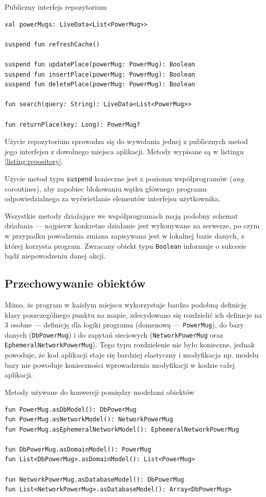 \documentclass[polish,polish,a4paper,12pt]{article}
\begin{document}
	\begin{listing}[H]
		\caption{Publiczny interfejs repozytorium}
		\begin{verbatim}
val powerMugs: LiveData<List<PowerMug>>

suspend fun refreshCache()

suspend fun updatePlace(powerMug: PowerMug): Boolean
suspend fun insertPlace(powerMug: PowerMug): Boolean
suspend fun deletePlace(powerMug: PowerMug): Boolean

fun search(query: String): LiveData<List<PowerMug>>

fun returnPlace(key: Long): PowerMug?
		\end{verbatim}
		\label{listing:repository}
	\end{listing}

	Użycie repozytorium sprowadza się do wywołania jednej z publicznych metod jego interfejsu z dowolnego miejsca aplikacji. Metody wypisane są w listingu \ref{listing:repository}.

	Użycie metod typu \texttt{suspend} konieczne jest z poziomu współprogramów (\textit{ang.} coroutines), aby zapobiec blokowaniu wątku głównego programu odpowiedzialnego za wyświetlanie elementów interfejsu użytkownika.

	Wszystkie metody działające we współprogramach mają podobny schemat działania — najpierw konkretne działanie jest wykonywane na serwerze, po czym w przypadku powodzenia zmiana zapisywana jest w lokalnej bazie danych, z której korzysta program. Zwracany obiekt typu \texttt{Boolean} informuje o sukcesie bądź niepowodzeniu danej akcji.

	\subsection{Przechowywanie obiektów}

	Mimo, że program w każdym miejscu wykorzystuje bardzo podobną definicję klasy poszczególnego punktu na mapie, zdecydowano się rozdzielić ich definicje na 3 osobne — definicję dla logiki programu (domenową — \texttt{PowerMug}), do bazy danych (\texttt{DbPowerMug}) i do zapytań sieciowych (\texttt{NetworkPowerMug} oraz \texttt{EphemeralNetworkPowerMug}). Tego typu rozdzielenie nie było konieczne, jednak powoduje, że kod aplikacji staje się bardziej elastyczny i modyfikacja np. modelu bazy nie powoduje konieczności wprowadzenia modyfikacji w kodzie całej aplikacji.

	\begin{listing}[H]
		\caption{Metody używane do konwersji pomiędzy modelami obiektów}
		\begin{verbatim}
fun PowerMug.asDbModel(): DbPowerMug
fun PowerMug.asNetworkModel(): NetworkPowerMug
fun PowerMug.asEphemeralNetworkModel(): EphemeralNetworkPowerMug

fun DbPowerMug.asDomainModel(): PowerMug
fun List<DbPowerMug>.asDomainModel(): List<PowerMug>

fun NetworkPowerMug.asDatabaseModel(): DbPowerMug
fun List<NetworkPowerMug>.asDatabaseModel(): Array<DbPowerMug>
		\end{verbatim}
		\label{listing:modelconversion}
	\end{listing}
\end{document}
